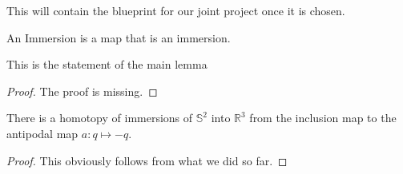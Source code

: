 %

This will contain the blueprint for our joint project once it is chosen.

\begin{definition}[Immersion]
  \label{def:immersion}
  \leanok
  An Immersion is a map that is an immersion.
\end{definition}

\begin{lemma}
  \label{lem:main}
  \leanok
  This is the statement of the main lemma
\end{lemma}

\begin{proof}
  The proof is missing.
\end{proof}

\begin{theorem}[Smale 1958]
  \label{thm:sphere_eversion}
  \leanok
  There is a homotopy of immersions of $𝕊^2$ into $ℝ^3$ from the inclusion map to
  the antipodal map $a : q ↦ -q$.
\end{theorem}

\begin{proof}
  \leanok
  This obviously follows from what we did so far.
\end{proof}